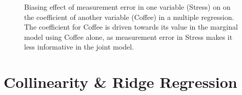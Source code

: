 \documentclass[
  letterpaper,
  10pt,
  krantz2]{krantz}
\begin{document}
\begin{figure}


\caption{\label{fig-coffee-measerr}Biasing effect of measurement error
in one variable (Stress) on on the coefficient of another variable
(Coffee) in a multiple regression. The coefficient for Coffee is driven
towards its value in the marginal model using Coffee alone, as
measurement error in Stress makes it less informative in the joint
model.}

\end{figure}%


\chapter{Collinearity \& Ridge Regression}\label{sec-collin}

\renewcommand*{\vec}[1]{\mathbf{#1}}
\newcommand{\trans}{^\mathsf{T}}
\newcommand*{\mat}[1]{\mathbf{#1}}
\newcommand*{\diag}[1]{\mathrm{diag}\, #1}

\renewcommand*{\det}[1]{\mathrm{det}(#1)}
\newcommand*{\rank}[1]{\mathrm{rank} (\mathbf{#1})}
\newcommand*{\trace}[1]{\mathrm{tr} (\mathbf{#1})}
\newcommand*{\dev}[1]{(#1 - \bar{#1})}
\newcommand*{\inv}[1]{\mat{#1}^{-1}}
\newcommand*{\half}[1]{\mat{#1}^{1/2}}
\newcommand*{\invhalf}[1]{\mat{#1}^{-1/2}}
\newcommand*{\nvec}[2]{{#1}_{1}, {#1}_{2},\ldots,{#1}_{#2}}
\newcommand*{\Beta}{\boldsymbol{B}}
\newcommand*{\Epsilon}{\boldsymbol{\Large\varepsilon}}
\newcommand*{\period}{\:\: .}
\newcommand*{\comma}{\:\: ,}
\newcommand*{\given}{\, | \,}
\newcommand*{\Real}[1]{\mathbb{R}^{#1}}
\newcommand*{\degree}[1]{{#1}^{\circ}}
\end{document}
